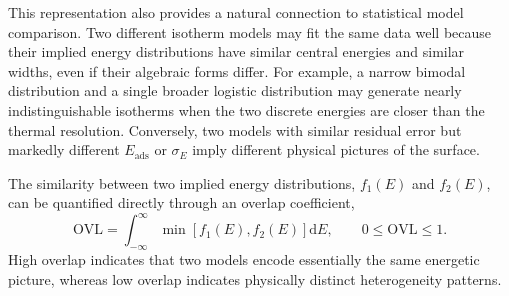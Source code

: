 \documentclass[journal=jacsat,manuscript=article]{achemso}
\begin{document}
	This representation also provides a natural connection to statistical model comparison. Two different isotherm models may fit the same data well because their implied energy distributions have similar central energies and similar widths, even if their algebraic forms differ. For example, a narrow bimodal distribution and a single broader logistic distribution may generate nearly indistinguishable isotherms when the two discrete energies are closer than the thermal resolution. Conversely, two models with similar residual error but markedly different $E_{\mathrm{ads}}$ or $\sigma_E$ imply different physical pictures of the surface.
	
	The similarity between two implied energy distributions, $f_1(E)$ and $f_2(E)$, can be quantified directly through an overlap coefficient,
	\begin{equation}
		\mathrm{OVL}
		=
		\int_{-\infty}^{\infty}
		\min\!\left[f_1(E),f_2(E)\right]\mathrm{d}E,
		\qquad
		0 \leq \mathrm{OVL} \leq 1.
		\label{eq:ovl_main}
	\end{equation}
	High overlap indicates that two models encode essentially the same energetic picture, whereas low overlap indicates physically distinct heterogeneity patterns. %
	
\end{document}
